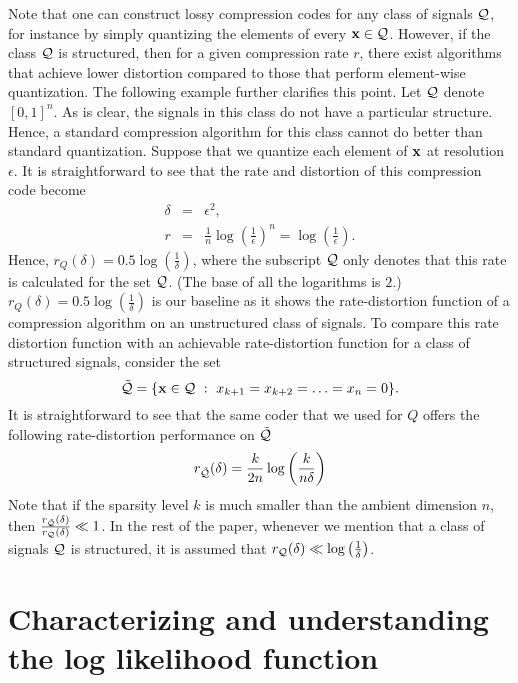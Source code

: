 \documentclass[onecolumn]{IEEEtran}
\begin{document}
Note that one can construct lossy compression codes for any class of signals ${\cal Q}$, for instance by simply quantizing the elements of every ${\bf x}\in \mathcal{Q}$. However, if the class ${\cal Q}$ is structured, then for a given compression rate $r$, there exist algorithms that achieve lower distortion compared to those that perform element-wise quantization. The following example further clarifies this point. 
Let $\mathcal{Q}$ denote $[0,1]^n$. As is clear, the signals in this class do not have a particular structure. Hence, a standard compression algorithm for this class cannot do better than standard quantization. Suppose that we quantize each element of ${\bf x}$ at resolution $\epsilon$. It is straightforward to see that the rate and distortion of this compression code become
\begin{eqnarray}
\delta &=&  \epsilon^2, \nonumber\\
r &=& \frac{1}{n} \log\left( \frac{1}{\epsilon} \right)^n = \log\left( \frac{1}{\epsilon} \right) . 
\end{eqnarray}
Hence, $r_Q(\delta) = 0.5\log \left( \frac{1}{\delta} \right)$, where the subscript $\mathcal{Q}$ only denotes that this rate is calculated for the set $\mathcal{Q}$. (The base of all the logarithms is $2$.) $r_Q(\delta) = 0.5\log \left( \frac{1}{\delta} \right)$ is our baseline as it shows the rate-distortion function of a compression algorithm on an unstructured class of signals.  
To compare this rate distortion function with an achievable rate-distortion function for a class of structured signals, consider the set 
\[
\tilde{\mathcal{Q}} = \{ {\bf x} \in \mathcal{Q} \ : \ x_{k+1} = x_{k+2}= \ldots = x_n=0 \}.
\]
It is straightforward to see that the same coder that we used for $Q$ offers the following rate-distortion performance on $\tilde{\mathcal{Q}}$
\[
r_{\tilde{\mathcal{Q}}}(\delta) = \frac{k}{2n} \log  \left( \frac{k}{n\delta} \right)
\]
 Note that if the sparsity level $k$ is much smaller than the ambient dimension $n$, then  $\frac{r_{\tilde{\mathcal{Q}}} (\delta)}{r_{\mathcal{Q}}(\delta)} \ll 1$. In the rest of the paper, whenever we mention that a class of signals $\mathcal{Q}$ is structured, it is assumed that $r_{\mathcal{Q}}(\delta) \ll  \log \left( \frac{1}{\delta} \right)$. 
 
 
 
\section{Characterizing  and understanding the log likelihood function}\label{sec:ML-recovery}
 
\end{document}
